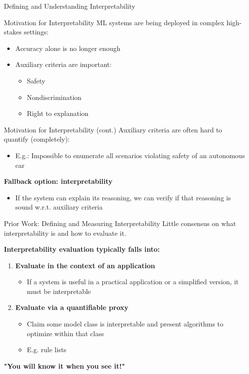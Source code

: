 \documentclass[10pt,aspectratio=169]{beamer}
\begin{document}
\begin{frame}{Defining and Understanding Interpretability}
\begin{block}{Motivation for Interpretability}
ML systems are being deployed in complex high-stakes settings:
\begin{itemize}
\item Accuracy alone is no longer enough
\item Auxiliary criteria are important:
\begin{itemize}
\item Safety
\item Nondiscrimination
\item Right to explanation
\end{itemize}
\end{itemize}
\end{block}
\end{frame}

\begin{frame}{Motivation for Interpretability (cont.)}
Auxiliary criteria are often hard to quantify (completely):
\begin{itemize}
\item E.g.: Impossible to enumerate all scenarios violating safety of an autonomous car
\end{itemize}

\textbf{Fallback option: interpretability}
\begin{itemize}
\item If the system can explain its reasoning, we can verify if that reasoning is sound w.r.t. auxiliary criteria
\end{itemize}
\end{frame}

\begin{frame}{Prior Work: Defining and Measuring Interpretability}
Little consensus on what interpretability is and how to evaluate it.

\textbf{Interpretability evaluation typically falls into:}
\begin{enumerate}
\item \textbf{Evaluate in the context of an application}
\begin{itemize}
\item If a system is useful in a practical application or a simplified version, it must be interpretable
\end{itemize}

\item \textbf{Evaluate via a quantifiable proxy}
\begin{itemize}
\item Claim some model class is interpretable and present algorithms to optimize within that class
\item E.g. rule lists
\end{itemize}
\end{enumerate}

\vspace{0.5cm}
\centering
\textbf{"You will know it when you see it!"}
\end{frame}
\end{document}
